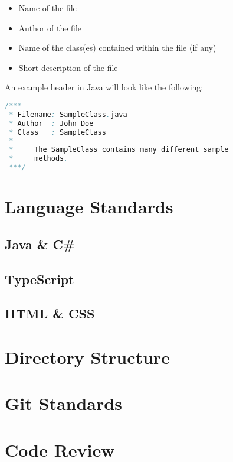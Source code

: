 \documentclass{article}
\begin{document}
    \begin{itemize}
        \item Name of the file
        \item Author of the file
        \item Name of the class(es) contained within the file (if any)
        \item Short description of the file
    \end{itemize}

    An example header in Java will look like the following:

    \begin{lstlisting}[language=Java]
/***
 * Filename: SampleClass.java
 * Author  : John Doe
 * Class   : SampleClass
 *
 *     The SampleClass contains many different sample
 *     methods.
 ***/
    \end{lstlisting}

    \newpage

    \section{Language Standards}
    \label{sec:ls}

    \subsection{Java \& C\#}
    \label{sec:ls-jcs}

    \subsection{TypeScript}
    \label{sec:ls-ts}

    \subsection{HTML \& CSS}
    \label{sec:ls-hc}

    \newpage

    \section{Directory Structure}
    \label{sec:ds}

    \newpage

    \section{Git Standards}
    \label{sec:gs}

    \newpage

    \section{Code Review}
    \label{sec:cr}
\end{document}
